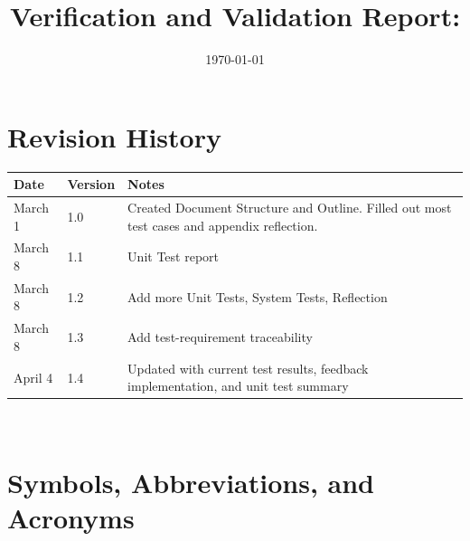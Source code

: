\documentclass[12pt, titlepage]{article}
\begin{document}
\title{Verification and Validation Report: \progname} 
\author{\authname}
\date{\today}
	
\maketitle


\section{Revision History}

\begin{tabularx}{\textwidth}{p{3cm}p{2cm}X}
  \toprule {\bf Date} & {\bf Version} & {\bf Notes}\\
  \midrule
  March 1 & 1.0 & Created Document Structure and Outline. Filled out most test cases and appendix reflection. \\
  March 8 & 1.1 & Unit Test report\\
  March 8 & 1.2 & Add more Unit Tests, System Tests, Reflection\\
  March 8 & 1.3 & Add test-requirement traceability\\
  April 4 & 1.4 & Updated with current test results, feedback implementation, and unit test summary\\
  \bottomrule
  \end{tabularx}

~\newpage

\section{Symbols, Abbreviations, and Acronyms}
\end{document}
